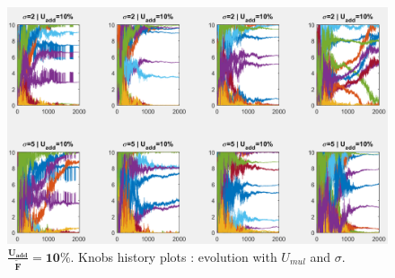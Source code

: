 \begin{figure}[h]
	\label{fig:uaddknobs10}
	\caption{$\mathbf{\frac{U_{add}}{\widetilde{F}}=10\%}$. Knobs history plots : evolution with $U_{mul}$ and $\sigma$.}
	\includegraphics[width=7in]{figures/results_figures/Uadd/knobs_Uadd_10_lambda_11.png}
\end{figure}